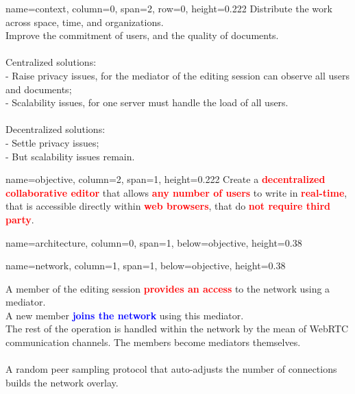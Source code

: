 \documentclass[a1paper, fontscale=0.38, portrait]{baposter}
\newcommand{\RED}[1]{\textcolor{red}{\textbf{#1}}}
\newcommand{\BLUE}[1]{\textcolor{blue}{\textbf{#1}}}
\newcommand{\FIRSTCOL}{0.222}
\newcommand{\SECONDCOL}{0.38}
\begin{document}
\begin{poster}
  {name=context, column=0, span=2, row=0, height=\FIRSTCOL} {
    Distribute the work across space, time, and organizations.\\
    Improve the commitment of users, and the quality of documents.\\
    \\
    Centralized solutions: \\
    - Raise privacy issues, for the mediator of the editing session can
      observe all users and documents; \\
    - Scalability issues, for one server must handle the load of all users. \\
    \\
    Decentralized solutions: \\
    - Settle privacy issues; \\
    - But scalability issues remain.
  }

  
  {name=objective, column=2, span=1, height=\FIRSTCOL} {%
    Create a \RED{decentralized collaborative editor} that allows \RED{any number
      of users} to write in \RED{real-time}, that is accessible directly within
    \RED{web browsers}, that do \RED{not require third party}.
  }

  {name=architecture, column=0, span=1, below=objective, height=\SECONDCOL}{
    \begin{center}
      
    \end{center}
  }
  
  {name=network, column=1, span=1, below=objective, height=\SECONDCOL}{
    \begin{center}
            
    \end{center}
    A member of the editing session \RED{provides an access} to the network using
    a mediator. \\
    A new member \BLUE{joins the network} using this mediator. \\
    The rest of the operation is handled within the network by the mean of
    WebRTC communication channels. The members become mediators themselves.\\
    \\
    A random peer sampling protocol that auto-adjusts the number of connections
    builds the network overlay.

}
\end{poster}
\end{document}
